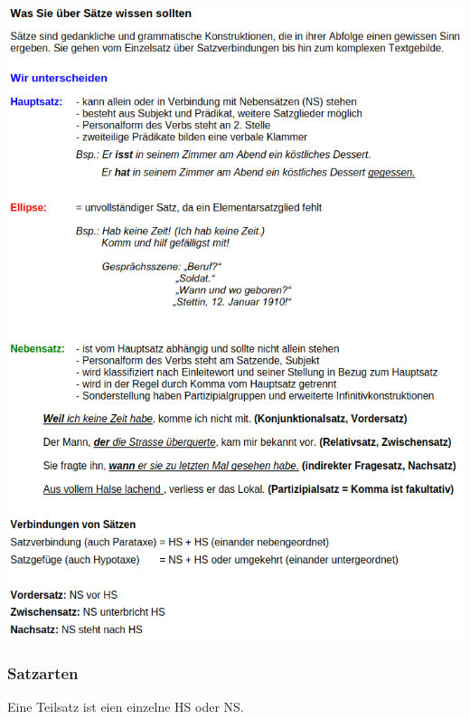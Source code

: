 \includegraphics[width=\textwidth]{./german/imgs/satze.png}

\subsubsection{Satzarten}
Eine Teilsatz ist eien einzelne HS oder NS.

